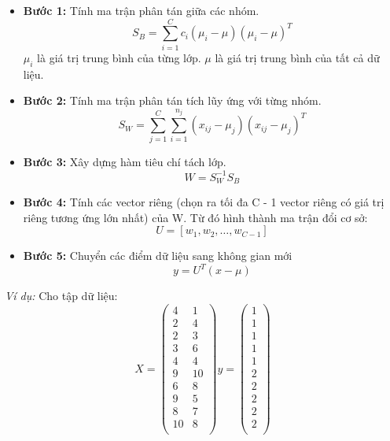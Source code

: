 \begin{itemize}
    \item \textbf{Bước 1:} Tính ma trận phân tán giữa các nhóm.
    \begin{equation}
        S_B=\sum_{i=1}^{C}{c_i(\mu_i - \mu)(\mu_i-\mu)^T}
    \end{equation}
    \subitem $\mu_i$ là giá trị trung bình của từng lớp. 
    \subitem $\mu$ là giá trị trung bình của tất cả dữ liệu. 

    \item \textbf{Bước 2:} Tính ma trận phân tán tích lũy ứng với từng nhóm.
    \begin{equation}
        S_W=\sum_{j=1}^{C}{\sum_{i=1}^{n_j}{(x_{ij}-\mu_j)(x_{ij}-\mu_j)^T}}
    \end{equation}

    \item \textbf{Bước 3:} Xây dựng hàm tiêu chí tách lớp.
    \begin{equation}
        W = S_W^{-1}S_B
    \end{equation}

	\item \textbf{Bước 4:} Tính các vector riêng (chọn ra tối đa C - 1 vector riêng có giá trị riêng tương ứng lớn nhất) của W. Từ đó hình thành ma trận đổi cơ sở:
	\begin{equation}
		U = \left[w_1, w_2, \ldots, w_{C-1}\right]
	\end{equation}

	\item \textbf{Bước 5:} Chuyển các điểm dữ liệu sang không gian mới
	\begin{equation}
		y = U^T(x - \mu)
	\end{equation}
\end{itemize}
\pagebreak

\textit{Ví dụ:} Cho tập dữ liệu:
$$
X = \left( \begin{array}{cc}
	4 & 1 \\
	2 & 4 \\
	2 & 3 \\
	3 & 6 \\
	4 & 4 \\
	9 & 10 \\
	6 & 8 \\
	9 & 5 \\
	8 & 7 \\
	10 & 8 \\

\end{array} \right)
%
y = \left( \begin{array}{c}
	1 \\
	1 \\
	1 \\
	1 \\
	1 \\
	2 \\
	2 \\
	2 \\
	2 \\
	2 \\
\end{array} \right)
$$

